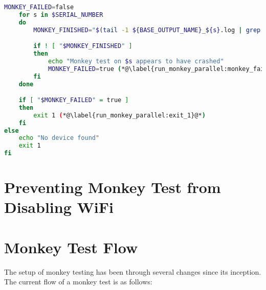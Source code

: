 \begin{lstlisting}[language=bash,caption=Script that runs monkey tests on all connected devices in parallel,label=lst:run_monkey_parallel]
    MONKEY_FAILED=false
    for s in $SERIAL_NUMBER
    do
        MONKEY_FINISHED="$(tail -1 ${BASE_OUTPUT_NAME}_${s}.log | grep -i "monkey finished")" (*@\label{run_monkey_parallel:check_output}@*)

        if ! [ "$MONKEY_FINISHED" ]
        then
            echo "Monkey test on $s appears to have crashed"
            MONKEY_FAILED=true (*@\label{run_monkey_parallel:monkey_failed}@*)
        fi
    done

    if [ "$MONKEY_FAILED" = true ]
    then
        exit 1 (*@\label{run_monkey_parallel:exit_1}@*)
    fi
else
    echo "No device found"
    exit 1
fi
\end{lstlisting}

\section{Preventing Monkey Test from Disabling WiFi}
\dummy

\section{Monkey Test Flow}\label{sec:monkey_test_flow}
The setup of monkey testing has been through several changes since its inception. The current flow of a monkey test is as follows:

